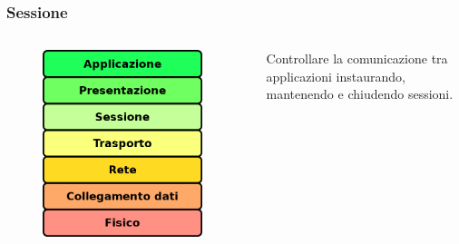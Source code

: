 \documentclass{beamer}
\begin{document}
\subsubsection*{Sessione}
\begin{frame}{\insertsection}{\insertsubsection}
\begin{columns}
\begin{figure}
\includegraphics[width=0.95\textwidth]{imgs/01-iso-osi.drawio.png}
\end{figure}
\begin{block}{\insertsubsubsection}
Controllare la comunicazione tra applicazioni instaurando, mantenendo e
chiudendo sessioni.
\end{block}
\end{columns}
\end{frame}
\end{document}
